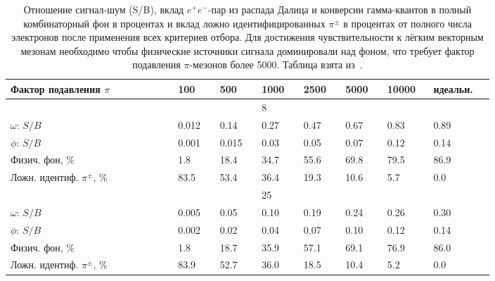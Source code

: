 \begin{table}[H]
\caption{Отношение сигнал-шум (S/B), вклад $e^{+}e^{-}$-пар из распада Далица и конверсии гамма-квантов в полный комбинаторный фон в процентах и вклад ложно идентифицированных $\pi^{\pm}$ в процентах от полного числа электронов после применения всех критериев отбора. Для достижения чувствительности к лёгким векторным мезонам необходимо чтобы физические источники сигнала доминировали над фоном, что требует фактор подавления $\pi$-мезонов более 5000. Таблица взята из~\cite{TDR_RICH}.}
\label{tabl:RICHchar}




\begin{tabular}{ | p{0.28\linewidth} p{0.07\linewidth} p{0.07\linewidth} p{0.07\linewidth} p{0.07\linewidth} p{0.07\linewidth} p{0.07\linewidth} p{0.1\linewidth} | }

\hline
Фактор подавления $\pi$ & 100 & 500 & 1000 & 2500 & 5000 & 10000 & идеальн. \\
\hline
\hline

& & & 8~\GeVperNucl{} & & & & \\
\hline
$\omega$: $S/B$ & 0.012 & 0.14 & 0.27 & 0.47 & 0.67 & 0.83 & 0.89 \\
\hline
$\phi$: $S/B$ & 0.001 & 0.015 & 0.03 & 0.05 & 0.07 & 0.12 & 0.14 \\
\hline
Физич. фон, \% & 1.8 & 18.4 & 34.7 & 55.6 & 69.8 & 79.5 & 86.9 \\
\hline
Ложн. идентиф. $\pi^{\pm}$, \% & 83.5 & 53.4 & 36.4 & 19.3 & 10.6 & 5.7 & 0.0 \\
\hline
\hline

& & & 25~\GeVperNucl{} & & & & \\
\hline
$\omega$: $S/B$ & 0.005 & 0.05 & 0.10 & 0.19 & 0.24 & 0.26 & 0.30 \\
\hline
$\phi$: $S/B$ & 0.002 & 0.02 & 0.04 & 0.07 & 0.10 & 0.12 & 0.14 \\
\hline
Физич. фон, \% & 1.8 & 18.7 & 35.9 & 57.1 & 69.1 & 76.9 & 86.0 \\
\hline
Ложн. идентиф. $\pi^{\pm}$, \% & 83.9 & 52.7 & 36.0 & 18.5 & 10.4 & 5.2 & 0.0 \\
\hline

\end{tabular}

\end{table}

